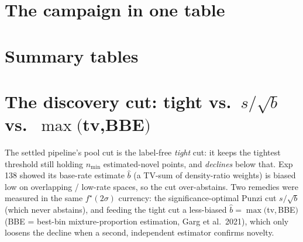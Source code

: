 \documentclass[10pt]{article}
\begin{document}
\clearpage
\section*{The campaign in one table}

\clearpage
\section*{Summary tables}


\clearpage

\section*{The discovery cut: tight vs.\ $s/\sqrt{b}$ vs.\ $\max($tv,BBE$)$}
The settled pipeline's pool cut is the label-free \emph{tight} cut: it keeps
the tightest threshold still holding $n_{\min}$ estimated-novel points, and
\emph{declines} below that.  Exp 138 showed its base-rate estimate
$\hat b$ (a TV-sum of density-ratio weights) is biased low on overlapping /
low-rate spaces, so the cut over-abstains.  Two remedies were measured in the
same $f^\star(2\sigma)$ currency: the significance-optimal Punzi cut
$s/\sqrt{b}$ (which never abstains), and feeding the tight cut a less-biased
$\hat b=\max($tv,\,BBE$)$ (BBE = best-bin mixture-proportion estimation,
Garg et al.\ 2021), which only loosens the decline when a second, independent
estimator confirms novelty.
\end{document}
